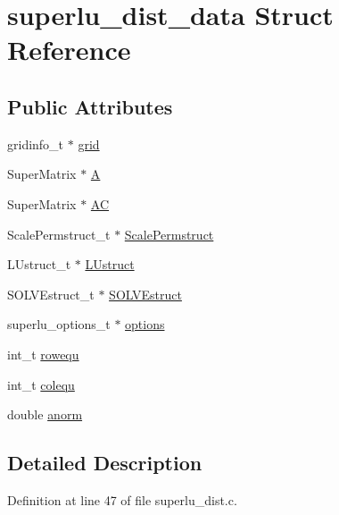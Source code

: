 \hypertarget{structsuperlu__dist__data}{}\section{superlu\+\_\+dist\+\_\+data Struct Reference}
\label{structsuperlu__dist__data}
\subsection*{Public Attributes}
\begin{DoxyCompactItemize}
\item 
gridinfo\+\_\+t $\ast$ \hyperlink{structsuperlu__dist__data_a4f94d5dfa393e9ac7e9955383a4ecf11}{grid}
\item 
Super\+Matrix $\ast$ \hyperlink{structsuperlu__dist__data_a8e78baf55994a10e8c84c6f1e8270c80}{A}
\item 
Super\+Matrix $\ast$ \hyperlink{structsuperlu__dist__data_a2ed2468ce6d4541a39e1a99532d362a6}{AC}
\item 
Scale\+Permstruct\+\_\+t $\ast$ \hyperlink{structsuperlu__dist__data_a357d3c922a6b07cdd542636eea85eb7e}{Scale\+Permstruct}
\item 
L\+Ustruct\+\_\+t $\ast$ \hyperlink{structsuperlu__dist__data_af6f100c80c4da3bccebe8d92b478c344}{L\+Ustruct}
\item 
S\+O\+L\+V\+Estruct\+\_\+t $\ast$ \hyperlink{structsuperlu__dist__data_a81a9e27c956d010d355e3378824f378b}{S\+O\+L\+V\+Estruct}
\item 
superlu\+\_\+options\+\_\+t $\ast$ \hyperlink{structsuperlu__dist__data_ac603ef3b87943cf1d1fe732bea09fc3d}{options}
\item 
int\+\_\+t \hyperlink{structsuperlu__dist__data_a37b3cd09e40a3a8853bc633592b71baa}{rowequ}
\item 
int\+\_\+t \hyperlink{structsuperlu__dist__data_afcd49a61eae2c99435c86aa0d652d3a3}{colequ}
\item 
double \hyperlink{structsuperlu__dist__data_acc2a4e57ead3ba7686c1adcdc882372b}{anorm}
\end{DoxyCompactItemize}


\subsection{Detailed Description}


Definition at line 47 of file superlu\+\_\+dist.\+c.



